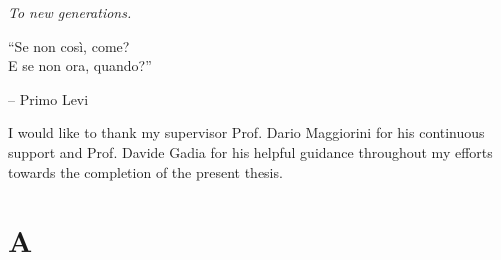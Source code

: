\documentclass[english]{report}
\begin{document}
\renewcommand\contentsname{Index}
\frontespizio
\beforepreface

{
\raggedleft \large \sl To new generations.\\
	
	\vspace{2cm}
	
	``Se non così, come?\\E se non ora, quando?''
	
	\bigskip
	
	\--- Primo Levi\\
}



I would like to thank my supervisor Prof. Dario Maggiorini for his continuous support and Prof. Davide Gadia for his helpful guidance throughout my efforts towards the completion of the present thesis.

%
%
\afterpreface

















% 
% 

\appendix

\chapter{A}


%
%


\end{document}
